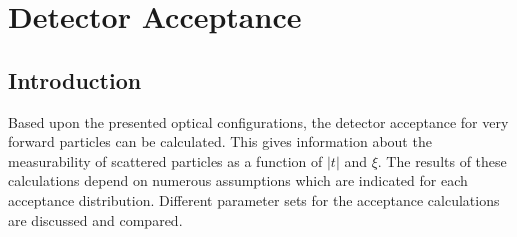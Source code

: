 \chapter{Detector Acceptance}\label{chap:6}
%
\section*{Introduction}
Based upon the presented optical configurations, the detector acceptance for very forward particles can be calculated. This gives information about the measurability of scattered particles as a function of $|t|$ and $\xi$. The results of these calculations depend on numerous assumptions which are indicated for each acceptance distribution. Different parameter sets for the acceptance calculations are discussed and compared.  

  
